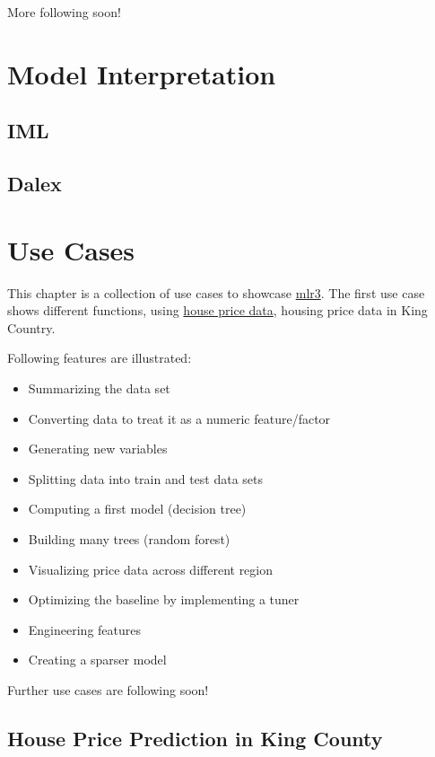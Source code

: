\documentclass[
  11pt,
  parskip=half,
  DIV=calc,
  BCOR=10mm,
  x11names]{scrbook}
\providecommand{\tightlist}{%
  \setlength{\itemsep}{0pt}\setlength{\parskip}{0pt}}
\begin{document}
More following soon!

\hypertarget{interpretation}{%
\chapter{Model Interpretation}\label{interpretation}}

\hypertarget{iml}{%
\section{IML}\label{iml}}

\hypertarget{dalex}{%
\section{Dalex}\label{dalex}}

\hypertarget{use-cases}{%
\chapter{Use Cases}\label{use-cases}}

This chapter is a collection of use cases to showcase \href{https://mlr3.mlr-org.com}{mlr3}.
The first use case shows different functions, using \protect\hyperlink{use-case-regr-houses}{house price data}, housing price data in King Country.

Following features are illustrated:

\begin{itemize}
\tightlist
\item
  Summarizing the data set
\item
  Converting data to treat it as a numeric feature/factor
\item
  Generating new variables
\item
  Splitting data into train and test data sets
\item
  Computing a first model (decision tree)
\item
  Building many trees (random forest)
\item
  Visualizing price data across different region
\item
  Optimizing the baseline by implementing a tuner
\item
  Engineering features
\item
  Creating a sparser model
\end{itemize}

Further use cases are following soon!

\hypertarget{use-case-regr-houses}{%
\section{House Price Prediction in King County}\label{use-case-regr-houses}}
\end{document}
